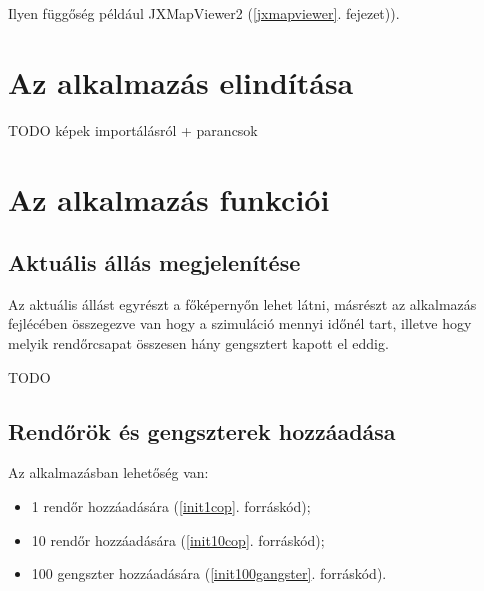 \documentclass[a4paper,12pt]{report}
\begin{document}
\vspace{2mm}
Ilyen függőség például JXMapViewer2 \cite{jxmapv} (\ref{jxmapviewer}. fejezet)).


\section{Az alkalmazás elindítása}
\label{howtorun}

TODO képek importálásról + parancsok

\section{Az alkalmazás funkciói}
\label{functions}


\subsection{Aktuális állás megjelenítése}
\label{actualstate}

Az aktuális állást egyrészt a főképernyőn lehet látni, másrészt az alkalmazás fejlécében összegezve van hogy a szimuláció mennyi időnél tart, illetve hogy melyik rendőrcsapat összesen hány gengsztert kapott el eddig.

TODO

\subsection{Rendőrök és gengszterek hozzáadása}
\label{addcops}

Az alkalmazásban lehetőség van:

\begin{itemize}
\item 1 rendőr hozzáadására (\ref{init1cop}. forráskód);
\item 10 rendőr hozzáadására (\ref{init10cop}. forráskód);
\item 100 gengszter hozzáadására (\ref{init100gangster}. forráskód).
\end{itemize}






\end{document}
